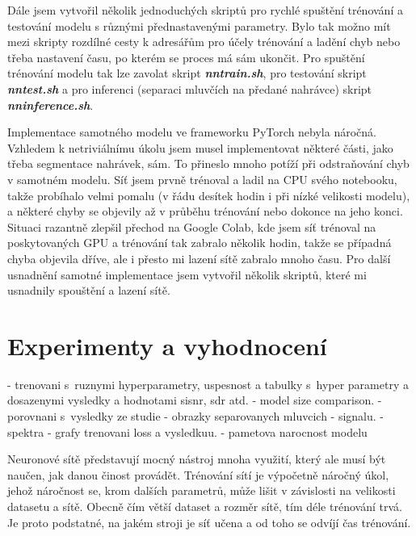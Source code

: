 Dále jsem vytvořil několik jednoduchých skriptů pro rychlé spuštění trénování a testování modelu s různými přednastavenými parametry. Bylo tak možno mít mezi skripty rozdílné cesty k adresářům pro účely trénování a ladění chyb nebo třeba nastavení času, po kterém se proces má sám ukončit. Pro spuštění trénování modelu tak lze zavolat skript \textbf{\textit{nntrain.sh}}, pro testování skript \textbf{\textit{nntest.sh}} a pro inferenci (separaci mluvčích na předané nahrávce) skript \textbf{\textit{nninference.sh}}.


\bigskip

Implementace samotného modelu ve frameworku PyTorch nebyla náročná. Vzhledem k netriviálnímu úkolu jsem musel implementovat některé části, jako třeba segmentace nahrávek, sám. To přineslo mnoho potíží při odstraňování chyb v samotném modelu. Síť jsem prvně trénoval a ladil na CPU svého notebooku, takže probíhalo velmi pomalu (v řádu desítek hodin i při nízké velikosti modelu), a některé chyby se objevily až v průběhu trénování nebo dokonce na jeho konci. Situaci razantně zlepšil přechod na Google Colab, kde jsem síť trénoval na poskytovaných GPU a trénování tak zabralo  několik hodin, takže se případná chyba objevila dříve, ale i přesto mi lazení sítě zabralo mnoho času. Pro další usnadnění samotné implementace jsem vytvořil několik skriptů, které mi usnadnily spouštění a lazení sítě.



\chapter{Experimenty a vyhodnocení}
\label{experimenty}
- trenovani s~ruznymi hyperparametry, uspesnost a tabulky s~hyper parametry a dosazenymi vysledky a hodnotami sisnr, sdr atd.
- model size comparison.
- porovnani s~vysledky ze studie
- obrazky separovanych mluvcich - signalu.
- spektra
- grafy trenovani loss a vysledkuu.
- pametova narocnost modelu


Neuronové sítě představují mocný nástroj mnoha využití, který ale musí být naučen, jak danou činost provádět. Trénování sítí je výpočetně náročný úkol, jehož náročnost se, krom dalších parametrů, může lišit v závislosti na velikosti datasetu a sítě. Obecně čím větší dataset a rozměr sítě, tím déle trénování trvá. Je proto podstatné, na jakém stroji je síť učena a od toho se odvíjí čas trénování.

